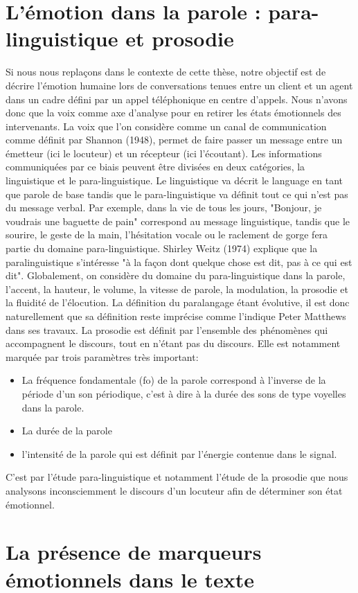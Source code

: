 \section{L'émotion dans la parole : para-linguistique et prosodie}
Si nous nous replaçons dans le contexte de cette thèse, notre objectif est de décrire l'émotion humaine lors de conversations tenues entre un client et un agent dans un cadre défini par un appel téléphonique en centre d'appels. Nous n'avons donc que la voix comme axe d'analyse pour en retirer les états émotionnels des intervenants.
La voix que l'on considère comme un canal de communication comme définit par Shannon (1948), permet de faire passer un message entre un émetteur (ici le locuteur) et un récepteur (ici l'écoutant). Les informations communiquées par ce biais peuvent être divisées en deux catégories, la linguistique et le para-linguistique.
Le linguistique va décrit le language en tant que parole de base tandis que le para-linguistique va définit tout ce qui n'est pas du message verbal. Par exemple, dans la vie de tous les jours, "Bonjour, je voudrais une baguette de pain" correspond au message linguistique, tandis que le sourire, le geste de la main, l'hésitation vocale ou le raclement de gorge fera partie du domaine para-linguistique. Shirley Weitz (1974) explique que la paralinguistique s'intéresse "à la façon dont quelque chose est dit, pas à ce qui est dit". Globalement, on considère du domaine du para-linguistique dans la parole, l'accent, la hauteur, le volume, la vitesse de parole, la modulation, la prosodie et la fluidité de l'élocution.
La définition du paralangage étant évolutive, il est donc naturellement que sa définition reste imprécise comme l'indique Peter Matthews dans ses travaux.
La prosodie est définit par l'ensemble des phénomènes qui accompagnent le discours, tout en n'étant pas du discours. Elle est notamment marquée par trois paramètres très important:
\begin{itemize}
  \item La fréquence fondamentale (fo) de la parole correspond à l'inverse de la période d'un son périodique, c'est à dire à la durée des sons de type voyelles dans la parole.
  \item La durée de la parole
  \item l'intensité de la parole qui est définit par l'énergie contenue dans le signal.
\end{itemize}
C'est par l'étude para-linguistique et notamment l'étude de la prosodie que nous analysons inconsciemment le discours d'un locuteur afin de déterminer son état émotionnel.

\section{La présence de marqueurs émotionnels dans le texte}
